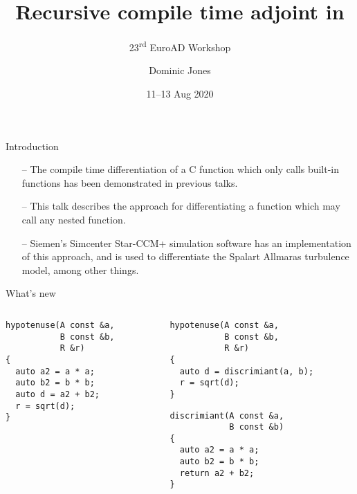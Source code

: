 \documentclass[xcolor=dvipsnames]{beamer}
\title{Recursive compile time adjoint in \CC}
\subtitle{23\textsuperscript{rd} EuroAD Workshop}
\author{Dominic Jones}
\date{\small{11--13 Aug 2020}}
\institute{\small{Siemens PLM, London}\\\small{\texttt{dominic.jones@cd-adapco.com}}}
\def\CC{{C\nolinebreak[4]\hspace{-.05em}\raisebox{.4ex}{\small\bf ++}}}
\begin{document}
\begin{frame}[plain]
  \titlepage
\end{frame}


\begin{frame}[fragile]{Introduction}
\begin{itemize}
\item[--] The compile time differentiation of a {\CC} function which only calls built-in functions has been demonstrated in previous talks. \vspace{3mm}
\item[--] This talk describes the approach for differentiating a function which may call any nested function. \vspace{3mm}
\item[--] Siemen's Simcenter Star-CCM+ simulation software has an implementation of this approach, and is used to differentiate the Spalart Allmaras turbulence model, among other things. \vspace{3mm}
\end{itemize}
\end{frame}




\begin{frame}[fragile]{What's new}
  \begin{columns}[T] %
    \begin{column}{0.44\textwidth}
      {\color{gray}{\; Flat structure (old)}}
      \begin{lstlisting}
hypotenuse(A const &a,
           B const &b,
           R &r)
{
  auto a2 = a * a;
  auto b2 = b * b;
  auto d = a2 + b2;
  r = sqrt(d);
}
  \end{lstlisting}
    \end{column}%
    \hfill%
    \begin{column}{0.56\textwidth}
      {\color{gray}{\; Nested structure (new)}}
        \begin{lstlisting}
hypotenuse(A const &a,
           B const &b,
           R &r)
{
  auto d = discrimiant(a, b);
  r = sqrt(d);
}
  \end{lstlisting}
  
  \begin{lstlisting}
discrimiant(A const &a,
            B const &b)
{
  auto a2 = a * a;
  auto b2 = b * b;
  return a2 + b2;
}
  \end{lstlisting}
    \end{column}%
  \end{columns}
\end{frame}
\end{document}
